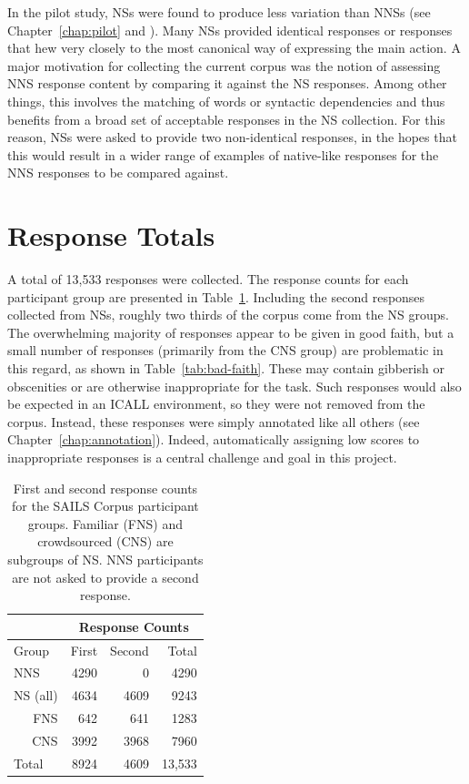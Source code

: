 In the pilot study, NSs were found to produce less variation than NNSs (see Chapter~\ref{chap:pilot} and \citealp[][]{king:dickinson:13}). Many NSs provided identical responses or responses that hew very closely to the most canonical way of expressing the main action. A major motivation for collecting the current corpus was the notion of assessing NNS response content by comparing it against the NS responses. Among other things, this involves the matching of words or syntactic dependencies and thus benefits from a broad set of acceptable responses in the NS collection. For this reason, NSs were asked to provide two non-identical responses, in the hopes that this would result in a wider range of examples of native-like responses for the NNS responses to be compared against.

\section{Response Totals}
\label{sec:response-totals}

A total of 13,533 responses were collected. The response counts for each participant group are presented in Table~\ref{tab:response-counts}. Including the second responses collected from NSs, roughly two thirds of the corpus come from the NS groups. The overwhelming majority of responses appear to be given in good faith, but a small number of responses (primarily from the CNS group) are problematic in this regard, as shown in Table~\ref{tab:bad-faith}. These may contain gibberish or obscenities or are otherwise inappropriate for the task. Such responses would also be expected in an ICALL environment, so they were not removed from the corpus. Instead, these responses were simply annotated like all others (see Chapter~\ref{chap:annotation}). Indeed, automatically assigning low scores to inappropriate responses is a central challenge and goal in this project.

\begin{table}[htb!]
\begin{center}
\begin{tabular}{|l||r|r||r|}
\hline
& \multicolumn{3}{c|}{Response Counts} \\
\hline
 Group & First & Second & Total \\
\hline
\hline
NNS & 4290 & 0 & 4290 \\
\hline
\hline
NS (all) & 4634 & 4609 & 9243 \\ %
\hline
\multicolumn{1}{|r||}{FNS} & 642 & 641 & 1283 \\ 
\hline
\multicolumn{1}{|r||}{CNS} & 3992 & 3968 & 7960 \\
\hline
\hline
Total & 8924 & 4609 & 13,533 \\
\hline
\end{tabular}
\caption{\label{tab:response-counts} First and second response counts for the SAILS Corpus participant groups. Familiar (FNS) and crowdsourced (CNS) are subgroups of NS. NNS participants are not asked to provide a second response.}
\end{center}
\end{table}

